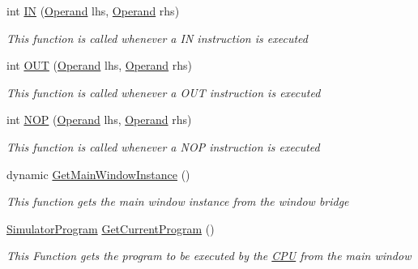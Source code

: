 \begin{DoxyCompactItemize}
int \hyperlink{class_c_p_u___o_s___simulator_1_1_c_p_u_1_1_instruction_aa69b150e3eb3bd70c52c88ddd738b4f8}{I\+N} (\hyperlink{class_c_p_u___o_s___simulator_1_1_c_p_u_1_1_operand}{Operand} lhs, \hyperlink{class_c_p_u___o_s___simulator_1_1_c_p_u_1_1_operand}{Operand} rhs)
\begin{DoxyCompactList}\small\item\em This function is called whenever a I\+N instruction is executed \end{DoxyCompactList}\item 
int \hyperlink{class_c_p_u___o_s___simulator_1_1_c_p_u_1_1_instruction_a4929ee60524cd9eb8951e94bffb91f05}{O\+U\+T} (\hyperlink{class_c_p_u___o_s___simulator_1_1_c_p_u_1_1_operand}{Operand} lhs, \hyperlink{class_c_p_u___o_s___simulator_1_1_c_p_u_1_1_operand}{Operand} rhs)
\begin{DoxyCompactList}\small\item\em This function is called whenever a O\+U\+T instruction is executed \end{DoxyCompactList}\item 
int \hyperlink{class_c_p_u___o_s___simulator_1_1_c_p_u_1_1_instruction_a2c5354e60009fdd0081fb7e474073961}{N\+O\+P} (\hyperlink{class_c_p_u___o_s___simulator_1_1_c_p_u_1_1_operand}{Operand} lhs, \hyperlink{class_c_p_u___o_s___simulator_1_1_c_p_u_1_1_operand}{Operand} rhs)
\begin{DoxyCompactList}\small\item\em This function is called whenever a N\+O\+P instruction is executed \end{DoxyCompactList}\item 
dynamic \hyperlink{class_c_p_u___o_s___simulator_1_1_c_p_u_1_1_instruction_a6b21a943b331f1c15871302e1ba66882}{Get\+Main\+Window\+Instance} ()
\begin{DoxyCompactList}\small\item\em This function gets the main window instance from the window bridge \end{DoxyCompactList}\item 
\hyperlink{class_c_p_u___o_s___simulator_1_1_c_p_u_1_1_simulator_program}{Simulator\+Program} \hyperlink{class_c_p_u___o_s___simulator_1_1_c_p_u_1_1_instruction_a64441a8d85d6eef7e4c58794cfcdca3c}{Get\+Current\+Program} ()
\begin{DoxyCompactList}\small\item\em This Function gets the program to be executed by the \hyperlink{namespace_c_p_u___o_s___simulator_1_1_c_p_u}{C\+P\+U} from the main window \end{DoxyCompactList}\item 

\end{DoxyCompactItemize}
